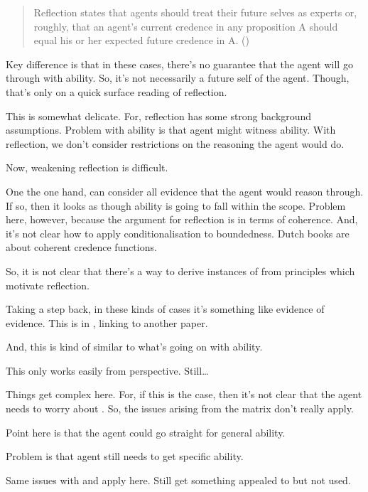 \begin{note}[Reflection]
\begin{quote}
    Reflection states that agents should treat their future selves as experts or, roughly, that an agent’s current credence in any proposition A should equal his or her expected future credence in A.\linebreak
    \mbox{}\hfill\mbox{(\Citeyear[59]{Briggs:2009up})}
  \end{quote}
\end{note}

\begin{note}
  Key difference is that in these cases, there's no guarantee that the agent will go through with ability.
  So, it's not necessarily a future self of the agent.
  Though, that's only on a quick surface reading of reflection.

  This is somewhat delicate.
  For, reflection has some strong background assumptions.
  Problem with ability is that agent might witness ability.
  With reflection, we don't consider restrictions on the reasoning the agent would do.

  Now, weakening reflection is difficult.

  One the one hand, can consider all evidence that the agent would reason through.
  If so, then it looks as though ability is going to fall within the scope.
  Problem here, however, because the argument for reflection is in terms of coherence.
  And, it's not clear how to apply conditionalisation to boundedness.
  Dutch books are about coherent credence functions.

  So, it is not clear that there's a way to derive instances of  from principles which motivate reflection.
\end{note}

\begin{note}
  Taking a step back, in these kinds of cases it's something like evidence of evidence.
  This is in \textcite[2]{Tal:2017uw}, linking to another paper.

  And, this is kind of similar to what's going on with ability.

  This only works easily from \AR{} perspective.
  Still\dots

  Things get complex here.
  For, if this is the case, then it's not clear that the agent needs to worry about .
  So, the issues arising from the matrix don't really apply.

  Point here is that the agent could go straight for general ability.

  Problem is that agent still needs to get specific ability.

  Same issues with \ESU{} and \nI{} apply here.
  Still get something appealed to but not used.
\end{note}

